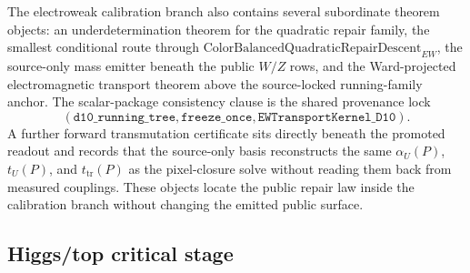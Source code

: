 \documentclass[11pt]{article}
\begin{document}
The electroweak calibration branch also contains several subordinate theorem objects: an
underdetermination theorem for the quadratic repair family, the smallest conditional route
through \(\mathrm{ColorBalancedQuadraticRepairDescent}_{EW}\), the source-only mass emitter
beneath the public \(W/Z\) rows, and the Ward-projected electromagnetic transport theorem above
the source-locked running-family anchor. The scalar-package consistency clause is the shared
provenance lock
\[
(\texttt{d10\_running\_tree},\texttt{freeze\_once},\texttt{EWTransportKernel\_D10}).
\]
A further forward transmutation certificate sits directly beneath the promoted readout and
records that the source-only basis reconstructs the same \(\alpha_U(P)\), \(t_U(P)\), and
\(t_{\mathrm{tr}}(P)\) as the pixel-closure solve without reading them back from measured
couplings. These objects locate the public repair law inside the calibration branch without
changing the emitted public surface.

\subsection{Higgs/top critical stage}
\end{document}
